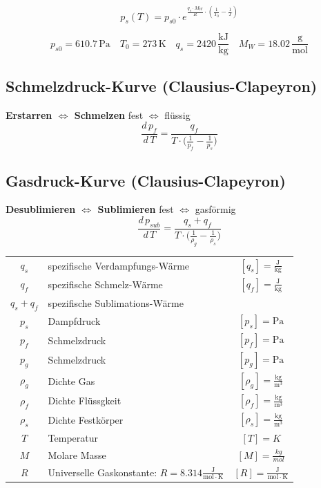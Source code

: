 $$ \boxed{ p_s(T) = p_{s0} \cdot e^{\frac{q_s \cdot M_W}{R} \cdot ( \frac{1}{T_0} - \frac{1}{T}) } } $$

$$ p_{s0} = 610.7 \, \mathrm{Pa} \quad T_0 = 273 \, \mathrm{K} \quad q_s = 2420 \, \mathrm{\frac{kJ}{kg}} \quad M_W = 18.02 \, \mathrm{\frac{g}{mol}}  $$



\subsection{Schmelzdruck-Kurve (Clausius-Clapeyron)}

\textbf{Erstarren $\Leftrightarrow$ Schmelzen}  \qquad fest $\Leftrightarrow$ flüssig \\

$$ \boxed{ \frac{d \, p_f}{d\, T} = \frac{q_f}{T \cdot  \Big( \frac{1}{p_f} - \frac{1}{p_s} \Big)  }     } $$




\subsection{Gasdruck-Kurve (Clausius-Clapeyron)}

\textbf{Desublimieren $\Leftrightarrow$ Sublimieren} \qquad fest $\Leftrightarrow$ gasförmig \\

$$ \boxed{ \frac{d \, p_{sub}}{d\, T} = \frac{q_s + q_f}{T \cdot  \Big( \frac{1}{\rho_g} - \frac{1}{\rho_s} \Big)  }     } $$



\begin{tabular}{c l c}
	\rule{0pt}{10pt}$q_s$ & spezifische Verdampfungs-Wärme & $[q_s] = \mathrm{\frac{J}{kg}}$ \\
	\rule{0pt}{10pt}$q_f$ & spezifische Schmelz-Wärme & $[q_f] = \mathrm{\frac{J}{kg}}$ \\
	$q_s + q_f$ & spezifische Sublimations-Wärme & \\
	$p_s$ & Dampfdruck & $[p_s] = \mathrm{Pa}$ \\
	$p_f$ & Schmelzdruck & $[p_f] = \mathrm{Pa}$ \\
	$p_g$ & Schmelzdruck & $[p_g] = \mathrm{Pa}$ \\
	\rule{0pt}{10pt}$\rho_g$ & Dichte Gas & $[\rho_g] = \mathrm{\frac{kg}{m^3}}$ \\
	\rule{0pt}{10pt}$\rho_f$ & Dichte Flüssgkeit & $[\rho_f] = \mathrm{\frac{kg}{m^3}}$ \\
	\rule{0pt}{10pt}$\rho_s$ & Dichte Festkörper & $[\rho_s] = \mathrm{\frac{kg}{m^3}}$ \\
	$T$ & Temperatur   & $[T] = K$ \\
	$M$ & Molare Masse & $[M] = \frac{kg}{mol}$ \\
	\rule{0pt}{8pt}$R$ & Universelle Gaskonstante: $R = 8.314 \mathrm{\frac{J}{mol \cdot K}}$ & $[R] = \mathrm{\frac{J}{mol \cdot K}} $ \\
\end{tabular}


